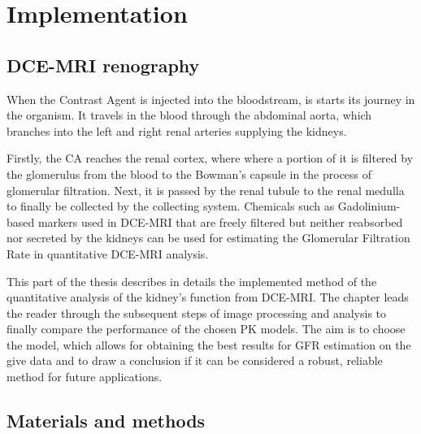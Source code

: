 \chapter{Implementation}
\section{DCE-MRI renography}
When the Contrast Agent is injected into the bloodstream, is starts its journey in the organism. It travels in the blood through the abdominal aorta, which branches  into the left and right renal arteries supplying the kidneys.  

Firstly, the CA reaches the renal cortex, where where a portion of it is filtered by the glomerulus from the blood to the Bowman's capsule in the process of glomerular filtration. Next, it is passed by the renal tubule to the renal medulla to finally be collected by the collecting system.   
Chemicals such as Gadolinium-based markers used in DCE-MRI that are freely filtered but neither reabsorbed nor secreted by the kidneys can be used for estimating the Glomerular Filtration Rate in quantitative DCE-MRI analysis.

This part of the thesis describes in details the implemented method of the quantitative analysis of the kidney's function from DCE-MRI. The chapter leads the reader through the subsequent steps of image processing and analysis to finally compare the performance of the chosen PK models. The aim is to choose the model, which allows for obtaining the best results for GFR estimation on the give data and to draw a conclusion if it can be considered a robust, reliable method for future applications. 

\section{Materials and methods}

